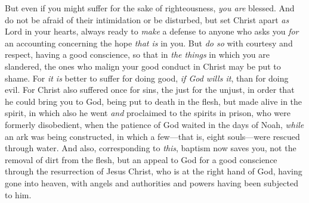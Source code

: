\begin{biblechapter}
\verse But even if you might suffer for the sake of righteousness, \textit{you are} blessed. And do not be afraid of their intimidation or be disturbed,
\verse but set Christ apart \textit{as} Lord in your hearts, always ready to \textit{make} a defense to anyone who asks you \textit{for} an accounting concerning the hope \textit{that is} in you.
\verse But \textit{do so} with courtesy and respect, having a good conscience, so that in \textit{the things} in which you are slandered, the ones who malign your good conduct in Christ may be put to shame.
\verse For \textit{it is} better to suffer for doing good, \textit{if God wills it}, than for doing evil.
\verse For Christ also suffered once for sins, 
the just for the unjust, 
in order that he could bring you to God, 
being put to death in the flesh, 
but made alive in the spirit,
\verse in which also he went \textit{and} proclaimed to the spirits in prison,
\verse who were formerly disobedient, when the patience of God waited in the days of Noah, \textit{while} an ark was being constructed, in which a few—that is, eight souls—were rescued through water.
\verse And also, corresponding to \textit{this}, baptism now saves you, not the removal of dirt from the flesh, but an appeal to God for a good conscience through the resurrection of Jesus Christ,
\verse who is at the right hand of God, having gone into heaven, with angels and authorities and powers having been subjected to him.
\end{biblechapter}

